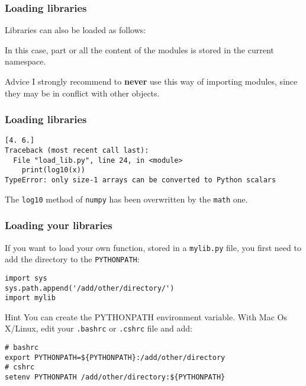 \begin{frame}[fragile]
    \frametitle{Loading libraries}
    Libraries can also be loaded as follows:
    
    In this case, part or all the content of the modules is stored in the current namespace.
    \begin{alertblock}{Advice}
I strongly recommend to \textbf{never} use this way of importing modules, since they may be in conflict with other objects.
    \end{alertblock}
\end{frame}

\begin{frame}[fragile]
    \frametitle{Loading libraries}
    
    \vspace{1em}
    \scriptsize
    \begin{verbatim}
[4. 6.]
Traceback (most recent call last):
  File "load_lib.py", line 24, in <module>
    print(log10(x))
TypeError: only size-1 arrays can be converted to Python scalars
    \end{verbatim}
    \normalsize
    
    The \verb+log10+ method of \verb+numpy+ has been overwritten by the \verb+math+ one.

\end{frame}

\begin{frame}[fragile]
\frametitle{Loading your libraries}
    If you want to load your own function, stored in a \verb+mylib.py+ file, you first need to add the directory to the \verb+PYTHONPATH+:
    \begin{lstlisting}[basicstyle=\ttfamily\scriptsize]
import sys
sys.path.append('/add/other/directory/')
import mylib
\end{lstlisting}

\begin{block}{Hint}
    \small
You can create the PYTHONPATH environment variable. With Mac Os X/Linux,  edit your \verb+.bashrc+ or \verb+.cshrc+ file and add:
\begin{verbatim}
# bashrc
export PYTHONPATH=${PYTHONPATH}:/add/other/directory
# cshrc
setenv PYTHONPATH /add/other/directory:${PYTHONPATH}
\end{verbatim}
\end{block}
\end{frame}

